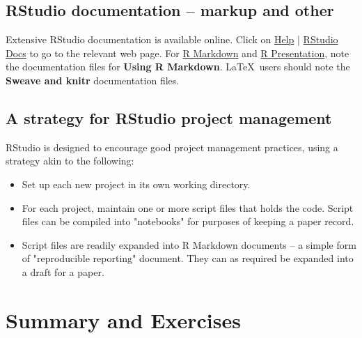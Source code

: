 \subsection{RStudio documentation -- markup and other}

Extensive RStudio documentation is available online.  Click on
\underline{Help} | \underline{RStudio Docs} to go to the relevant web
page. For \underline{R Markdown} and \underline{R Presentation}, note
the documentation files for {\bf Using R Markdown}.  \LaTeX\ users
should note the {\bf Sweave and knitr} documentation files.

\subsection{A strategy for RStudio project management}

RStudio is designed to encourage good project management practices,
using a strategy akin to the following:
\begin{itemize}
\item[] Set up each new project in its own working directory.
\item[] For each project, maintain one or more script files that
holds the code.  Script files can be compiled into "notebooks"
for purposes of keeping a paper record.
\item[] Script files are readily expanded into R Markdown documents
-- a simple form of "reproducible reporting" document.  They can
as required be expanded into a draft for a paper.
\end{itemize}


\section{Summary and Exercises}

